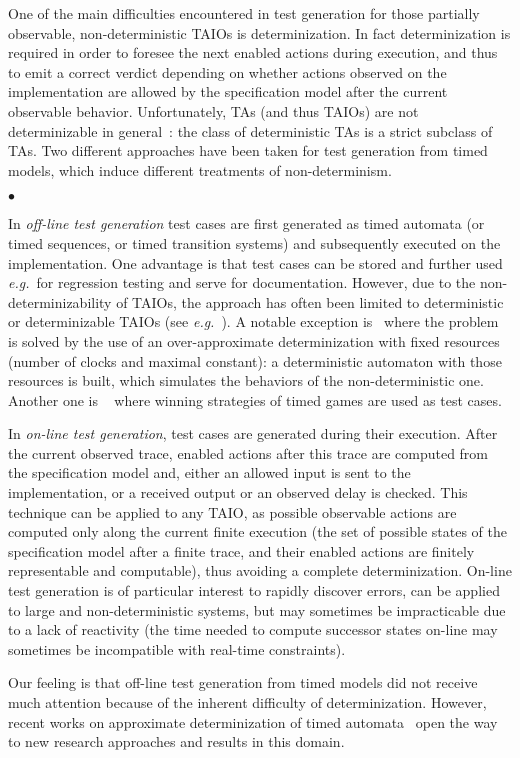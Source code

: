 \documentclass{LMCS}
\theoremstyle{plain}\newtheorem{proposition}[thm]{Proposition}
\def\eg{{\em e.g.}}
\begin{document}
One of the main difficulties encountered in test generation for those
partially observable, non-deterministic TAIOs is determinization.
In fact determinization 
is required in order to foresee the next enabled actions during
execution, and thus to emit a correct verdict depending on whether 
actions observed on the implementation 
are allowed by the specification model after the current observable behavior.
Unfortunately, TAs (and thus TAIOs) are not determinizable in general~\cite{AlurDill94}: the class of deterministic TAs is a strict subclass of TAs. 
Two different approaches have been taken for test generation from timed models,
which induce different treatments of non-determinism. 
\begin{iteMize}{$\bullet$}
\item 
In {\em off-line test generation} test cases are first generated as
timed automata (or timed sequences, or timed transition systems) 
and subsequently
executed on the implementation.  One advantage is that test cases can
be stored and further used \eg~for regression testing and serve for
documentation.  However, due to the non-determinizability of TAIOs,
the approach has often been limited to deterministic or determinizable TAIOs 
(see \eg~\cite{KhoumsiJeronMarchand-FATES03,NielsenSkou-STTT03}).
A notable exception is~\cite{KrichenTripakis09} where the problem is solved by the
use of an over-approximate determinization with fixed resources 
(number of clocks and maximal constant): 
a deterministic automaton with those resources is built, 
which simulates the behaviors of the non-deterministic one.
Another one is 
~\cite{DavidLarsenLiNielsen-ICST09} where winning strategies of
 timed games are used as test cases.
\item In {\em on-line test generation}, test cases are generated
  during their execution.  After the current observed trace, enabled
  actions after this trace are computed from the specification model
  and, either an allowed input is sent to the implementation, or a
  received output or an observed delay is checked.  This technique can
  be applied to any TAIO, as possible observable actions are computed
  only along the current finite execution (the set of possible states
  of the specification model after a finite trace, and their enabled
  actions are finitely representable and computable), thus
  avoiding a complete determinization.  On-line test generation is of
  particular interest to rapidly discover errors, can be applied
    to large and non-deterministic systems, but may sometimes be
  impracticable due to a lack of reactivity (the time needed to
  compute successor states on-line may sometimes be incompatible with
  real-time constraints).
\end{iteMize}
Our feeling is that off-line test generation from timed models 
did not receive much attention because of the inherent difficulty 
of determinization. 
However, recent works on approximate determinization of timed automata~\cite{KrichenTripakis09,BertrandStainerJeronKrichen-FOSSACS2011} 
open the way to new research approaches and results in this domain.
\end{document}
